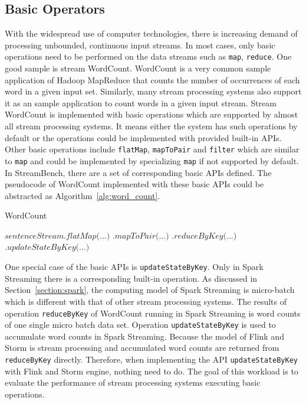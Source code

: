\subsection{Basic Operators}

With the widespread use of computer technologies, there is increasing demand of processing unbounded, continuous input streams. In most cases, only basic operations need to be performed on the data streams such as \texttt{map}, \texttt{reduce}. One good sample is stream WordCount. WordCount is a very common sample application of Hadoop MapReduce that counts the number of occurrences of each word in a given input set.\cite{MapReduce} Similarly, many stream processing systems also support it as an sample application to count words in a  given input stream. Stream WordCount is implemented with basic operations which are supported by almost all stream processing systems. It means either the system has such operations by default or the operations could be implemented with provided built-in APIs. Other basic operations include \texttt{flatMap}, \texttt{mapToPair} and \texttt{filter} which are similar to \texttt{map} and could be implemented by specializing \texttt{map} if not supported by default. In StreamBench, there are a set of corresponding basic APIs defined. The pseudocode of WordCount implemented with these basic APIs could be abstracted as Algorithm~\ref{alg:word_count}.

\begin{algorithm}
\caption{WordCount}\label{euclid}
\label{alg:word_count}
\begin{algorithmic}[1]
\State $\textit{sentenceStream.flatMap(...)}$
\State \hspace{2.6cm} $\textit{.mapToPair(...)}$
\State \hspace{2.6cm} $\textit{.reduceByKey(...)}$
\State \hspace{2.6cm} $\textit{.updateStateByKey(...)}$

\end{algorithmic}
\end{algorithm}

One special case of the basic APIs is \texttt{updateStateByKey}. Only in Spark Streaming there is a corresponding built-in operation. As discussed in Section~\ref{section:spark}, the computing model of Spark Streaming is micro-batch which is different with that of other stream processing systems. The results of operation \texttt{reduceByKey} of WordCount running in Spark Streaming is word counts of one single micro batch data set. Operation \texttt{updateStateByKey} is used to accumulate word counts in Spark Streaming. Because the model of Flink and Storm is stream processing and accumulated word counts are returned from \texttt{reduceByKey} directly. Therefore, when implementing the API \texttt{updateStateByKey} with Flink and Storm engine, nothing need to do. The goal of this workload is to evaluate the performance of stream processing systems executing basic operations.  


